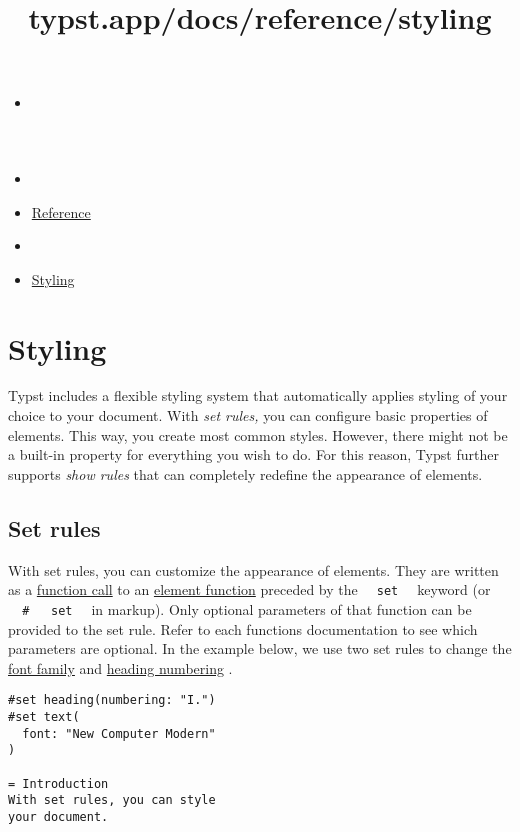 \title{typst.app/docs/reference/styling}

\begin{itemize}
\tightlist
\item
  \href{/docs}{}
\item
  
\item
  \href{/docs/reference/}{Reference}
\item
  
\item
  \href{/docs/reference/styling/}{Styling}
\end{itemize}

\section{Styling}\label{styling}

Typst includes a flexible styling system that automatically applies
styling of your choice to your document. With \emph{set rules,} you can
configure basic properties of elements. This way, you create most common
styles. However, there might not be a built-in property for everything
you wish to do. For this reason, Typst further supports \emph{show
rules} that can completely redefine the appearance of elements.

\subsection{Set rules}\label{set-rules}

With set rules, you can customize the appearance of elements. They are
written as a \href{/docs/reference/foundations/function/}{function call}
to an
\href{/docs/reference/foundations/function/\#element-functions}{element
function} preceded by the \texttt{\ }{\texttt{\ set\ }}\texttt{\ }
keyword (or
\texttt{\ }{\texttt{\ \#\ }}\texttt{\ }{\texttt{\ set\ }}\texttt{\ } in
markup). Only optional parameters of that function can be provided to
the set rule. Refer to each function\textquotesingle s documentation to
see which parameters are optional. In the example below, we use two set
rules to change the
\href{/docs/reference/text/text/\#parameters-font}{font family} and
\href{/docs/reference/model/heading/\#parameters-numbering}{heading
numbering} .

\begin{verbatim}
#set heading(numbering: "I.")
#set text(
  font: "New Computer Modern"
)

= Introduction
With set rules, you can style
your document.
\end{verbatim}

